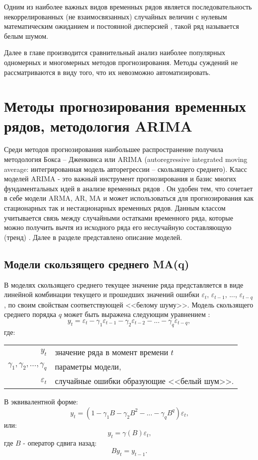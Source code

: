 \documentclass[a4paper,14pt,russian]{extreport}
\makeatletter
\newenvironment{eqwhere}
	{где:
		\par\noindent\hspace{2em}\begin{tabular}{>{$}r<{$} @{${}$ -- {}} l}
	}
	{\end{tabular}\par\vspace{\belowdisplayskip}}
\makeatother
\begin{document}
Одним из наиболее важных видов временных рядов является 
последовательность некоррелированных (не взаимосвязанных) случайных 
величин с нулевым математическим ожиданием и постоянной дисперсией 
\cite{fuller1996, runova2013}, такой ряд называется белым шумом.

Далее в главе производится сравнительный анализ наиболее популярных 
одномерных и многомерных методов прогнозирования. Методы суждений не 
рассматриваются в виду того, что их невозможно автоматизировать.

\section{Методы прогнозирования временных рядов, методология ARIMA} 
Среди методов прогнозирования наибольшее распространение получила 
методология Бокса -- Дженкинса или ARIMA (autoregressive integrated moving 
average: интегрированная модель авторегрессии -- скользящего среднего). Класс 
моделей ARIMA - это важный инструмент прогнозирования и базис многих 
фундаментальных идей в анализе временных рядов \cite{chatfield2000}. Он 
удобен тем, что сочетает в себе модели ARMA, AR, MA и может использоваться 
для прогнозирования как стационарных так и нестационарных временных рядов. 
Данным классом учитывается связь между случайными остатками временного 
ряда, которые можно получить вычтя из исходного ряда его неслучайную 
составляющую (тренд) \cite{tihonov2006}. Далее в разделе представлено описание 
моделей.


\subsection{Модели скользящего среднего MA(q)}
В моделях скользящего среднего текущее значение ряда представляется в виде 
линейной комбинации текущего и прошедших значений ошибки $\varepsilon_t$, 
$\varepsilon_{t-1}$, $...$, $\varepsilon_{t-q}$, по своим свойствам соответствующей 
<<белому шуму>>. Модель скользящего среднего порядка $q$ 
может быть выражена следующим уравнением \cite{runova2013}:
\begin{equation}
	y_t = \varepsilon_t - \gamma_1 \varepsilon_{t-1} - \gamma_2 \varepsilon_{t-2} 
		- ... - \gamma_q \varepsilon_{t-q}, 
\end{equation} 
\begin{eqwhere}
	y_t	& значение ряда в момент времени $t$ \\
	\gamma_1, \gamma_2, ..., \gamma_q 	& параметры модели, \\
	\varepsilon_t	& случайные ошибки образующие <<белый шум>>.\\
\end{eqwhere}
В эквивалентной форме:
\begin{equation}
	y_t = (1 - \gamma_1 B - \gamma_2 B^2 - ... - \gamma_q B^q)\varepsilon_t \text{,} 
\end{equation}
или:
\begin{equation}
	y_t = \gamma(B)\varepsilon_t \text{,} 
\end{equation}
где $B$ - оператор сдвига назад:
\begin{equation}
	B y_t = y_{t-1} \text{.} \nonumber
\end{equation}
\end{document}
